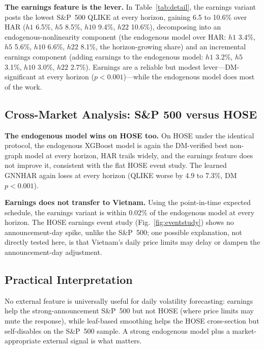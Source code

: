 \documentclass[runningheads,a4paper]{llncs}
\begin{document}
\textbf{The earnings feature is the lever.} In Table~\ref{tab:detail}, the earnings variant posts the lowest S\&P~500
QLIKE at every horizon, gaining 6.5 to 10.6\% over HAR ($h1$ 6.5\%, $h5$ 8.5\%, $h10$ 9.4\%, $h22$ 10.6\%),
decomposing into an endogenous-nonlinearity component (the endogenous model over HAR: $h1$ 3.4\%, $h5$ 5.6\%, $h10$ 6.6\%,
$h22$ 8.1\%, the horizon-growing share) and an incremental earnings component (adding earnings to the endogenous model: $h1$ 3.2\%,
$h5$ 3.1\%, $h10$ 3.0\%, $h22$ 2.7\%). Earnings are a reliable but modest lever---DM-significant at every
horizon ($p<0.001$)---while the endogenous model does most of the work.

\subsection{Cross-Market Analysis: S\&P 500 versus HOSE}\label{sec:hose}
\textbf{The endogenous model wins on HOSE too.} On HOSE under the identical protocol, the endogenous XGBoost model is again the
DM-verified best non-graph model at every horizon, HAR trails widely, and the earnings feature does not
improve it, consistent with the flat HOSE event study. The learned GNNHAR again loses at
every horizon (QLIKE worse by 4.9 to 7.3\%, DM $p<0.001$).

\textbf{Earnings does not transfer to Vietnam.} Using the point-in-time expected schedule, the earnings variant is within
0.02\% of the endogenous model at every horizon. The HOSE earnings event study (Fig.~\ref{fig:eventstudy}) shows no
announcement-day spike, unlike the S\&P~500; one possible explanation, not directly tested here, is that
Vietnam's daily price limits may delay or dampen the announcement-day adjustment.

\subsection{Practical Interpretation}
No external feature is universally useful for daily volatility forecasting: earnings help the
strong-announcement S\&P~500 but not HOSE (where price limits may mute the response), while
leaf-based smoothing helps the HOSE cross-section but self-disables on the S\&P~500 sample. A strong
endogenous model plus a market-appropriate external signal is what matters.
\end{document}

